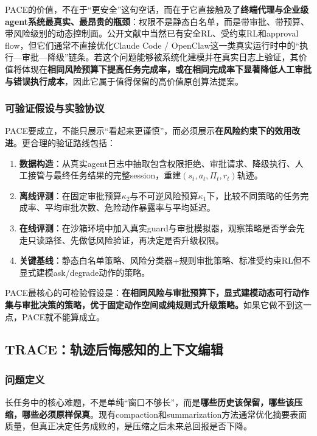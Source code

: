 \documentclass[12pt,a4paper]{article}
\begin{document}
PACE的价值，不在于“更安全”这句空话，而在于它直接触及了\textbf{终端代理与企业级agent系统最真实、最昂贵的瓶颈}：权限不是静态白名单，而是带审批、带预算、带风险级别的动态控制面。公开文献中当然已有安全RL、受约束RL和approval flow，但它们通常不直接优化Claude Code / OpenClaw这一类真实运行时中的“执行—审批—降级”链条。若这个问题能够被系统化建模并在真实日志上验证，其价值将体现在\textbf{相同风险预算下提高任务完成率，或在相同完成率下显著降低人工审批与错误执行成本}，因此它属于值得保留的高价值原创算法提案。

\subsubsection{可验证假设与实验协议}

PACE要成立，不能只展示“看起来更谨慎”，而必须展示\textbf{在风险约束下的效用改进}。更合理的验证路线包括：

\begin{enumerate}
    \item \textbf{数据构造}：从真实agent日志中抽取包含权限拒绝、审批请求、降级执行、人工接管与最终任务结果的完整session，重建$(s_t,a_t,\Pi_t,r_t)$轨迹。
    \item \textbf{离线评测}：在固定审批预算$\kappa_2$与不可逆风险预算$\kappa_1$下，比较不同策略的任务完成率、平均审批次数、危险动作暴露率与平均延迟。
    \item \textbf{在线评测}：在沙箱环境中加入真实guard与审批模拟器，观察策略是否学会先走只读路径、先做低风险验证，再决定是否升级权限。
    \item \textbf{关键基线}：静态白名单策略、风险分类器+规则审批策略、标准受约束RL但不显式建模ask/degrade动作的策略。
\end{enumerate}

PACE最核心的可检验假设是：\textbf{在相同风险与审批预算下，显式建模动态可行动作集与审批决策的策略，优于固定动作空间或纯规则式升级策略。}如果它做不到这一点，PACE就不能算成立。

\subsection{TRACE：轨迹后悔感知的上下文编辑}

\subsubsection{问题定义}

长任务中的核心难题，不是单纯“窗口不够长”，而是\textbf{哪些历史该保留，哪些该压缩，哪些必须原样保真}。现有compaction和summarization方法通常优化摘要表面质量，但真正决定任务成败的，是压缩之后未来总回报是否下降。
\end{document}

